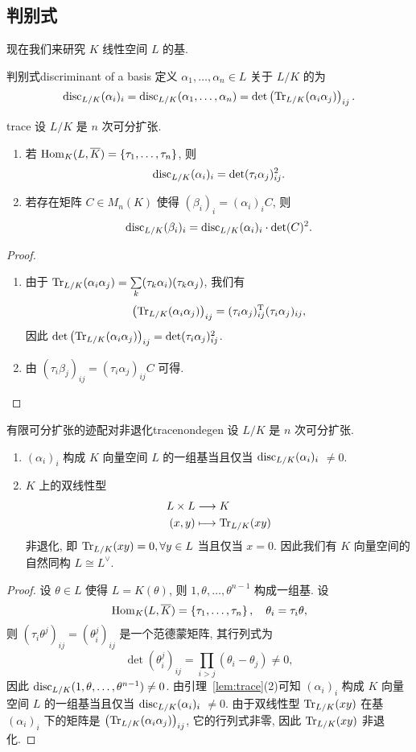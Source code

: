 \subsection{判别式}
现在我们来研究 $K$ 线性空间 $L$ 的基.
\begin{definition}{判别式}{discriminant of a basis}
定义 $\alpha_1,\dots,\alpha_n\in L$ 关于 $L/K$ 的为
  \[{\mathrm{disc}}_{L/K}(\alpha_i)_i={\mathrm{disc}}_{L/K}(\alpha_1,\dots,\alpha_n)=\det\left({\mathrm{Tr}}_{L/K}(\alpha_i\alpha_j)\right)_{ij}.\]
\end{definition}
  
\begin{lemma}{}{trace}
设 $L/K$ 是 $n$ 次可分扩张.
\begin{enumerate}
  \item 若 ${\mathrm{Hom}}_K(L,\overline K)=\left\{\tau_1,\dots,\tau_n\right\}$, 则
  \[{\mathrm{disc}}_{L/K}(\alpha_i)_i=\det(\tau_i \alpha_j)_{ij}^2.\]
  \item 若存在矩阵 $C\in M_n(K)$ 使得 $(\beta_i)_i=(\alpha_i)_i C$, 则
  \[{\mathrm{disc}}_{L/K}(\beta_i)_i={\mathrm{disc}}_{L/K}(\alpha_i)_i\cdot\det(C)^2.\]
\end{enumerate}
\end{lemma}
\begin{proof}
\begin{enumerate}
  \item 由于 ${\mathrm{Tr}}_{L/K}(\alpha_i\alpha_j)=\sum\limits_k (\tau_k\alpha_i)(\tau_k\alpha_j)$, 我们有 
  \[\left({\mathrm{Tr}}_{L/K}(\alpha_i\alpha_j)\right)_{ij}=(\tau_i\alpha_j)_{ij}^{\mathrm{T}}(\tau_i\alpha_j)_{ij},\]
因此 $\det\left({\mathrm{Tr}}_{L/K}(\alpha_i\alpha_j)\right)_{ij}=\det(\tau_i\alpha_j)_{ij}^2$.
  \item 由 $(\tau_i\beta_j)_{ij}=(\tau_i\alpha_j)_{ij}C$ 可得.
\end{enumerate}
\end{proof}

\begin{proposition}{有限可分扩张的迹配对非退化}{tracenondegen}
设 $L/K$ 是 $n$ 次可分扩张.
\begin{enumerate}
  \item $(\alpha_i)_i$ 构成 $K$ 向量空间 $L$ 的一组基当且仅当 ${\mathrm{disc}}_{L/K}(\alpha_i)_i$ $\neq 0$.
  \item $K$ 上的双线性型 
  \[\begin{split}L\times L &\longrightarrow K \\ (x,y) &\longmapsto {\mathrm{Tr}}_{L/K}(xy)\end{split}\]
  非退化, 即 ${\mathrm{Tr}}_{L/K}(xy)=0,\forall y\in L$ 当且仅当 $x=0$. 因此我们有 $K$ 向量空间的自然同构 $L\cong L^\vee$.
\end{enumerate}
\end{proposition}
\begin{proof}
设 $\theta\in L$ 使得 $L=K(\theta)$, 则 $1,\theta,\dots,\theta^{n-1}$ 构成一组基. 设 
  \[{\mathrm{Hom}}_K(L,\overline K)=\left\{\tau_1,\dots,\tau_n\right\},\quad \theta_i=\tau_i \theta,\]
则 $(\tau_i \theta^j)_{ij}=(\theta_i^j)_{ij}$ 是一个范德蒙矩阵, 其行列式为
  \[\det(\theta_i^j)_{ij}=\prod_{i>j}(\theta_i-\theta_j)\neq 0,\]
因此 ${\mathrm{disc}}_{L/K}(1,\theta,\dots,\theta^{n-1})\neq 0$. 由引理~\ref{lem:trace}(2)可知 $(\alpha_i)_i$ 构成 $K$ 向量空间 $L$ 的一组基当且仅当 ${\mathrm{disc}}_{L/K}(\alpha_i)_i$ $\neq 0$.
由于双线性型 ${\mathrm{Tr}}_{L/K}(xy)$ 在基 $(\alpha_i)_i$ 下的矩阵是 $\left({\mathrm{Tr}}_{L/K}(\alpha_i\alpha_j)\right)_{ij}$, 它的行列式非零, 因此 ${\mathrm{Tr}}_{L/K}(xy)$ 非退化.
\end{proof}

